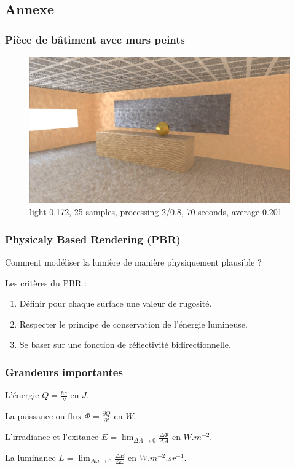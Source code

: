 \documentclass[handout]{beamer}
\begin{document}
\subsection{Annexe}

\begin{frame}
    \frametitle{Pièce de bâtiment avec murs peints}

    \begin{figure}
        \includegraphics[scale=0.25]{piece_peinture_triche.png}
        \caption{light 0.172, 25 samples, processing 2/0.8, 70 seconds, average 0.201}
    \end{figure}

\end{frame}


\begin{frame}

    \frametitle{Physicaly Based Rendering (PBR)}

    Comment modéliser la lumière de manière physiquement plausible ?

    Les critères du PBR :
    \begin{enumerate}
        \item Définir pour chaque surface une valeur de rugosité.
        \item Respecter le principe de conservation de l'énergie lumineuse.
        \item Se baser sur une fonction de réflectivité bidirectionnelle.
    \end{enumerate}
    
\end{frame}

\begin{frame}

    \frametitle{Grandeurs importantes}

    L'énergie $ Q = \frac{hc}{\nu} $ en $ J $.

    La puissance ou flux $ \Phi = \frac{\partial Q}{\partial t} $ en $ W $.

    L'irradiance et l'exitance $ E = \lim_{\Delta A \to 0}  \frac{\Delta \Phi }{\Delta A} $ en $W.m^{-2} $.

    La luminance $ L = \lim_{\Delta \omega \to 0}  \frac{\Delta E }{\Delta \omega } $ en $ W.m^{-2}.sr^{-1} $.
\end{frame}
\end{document}
